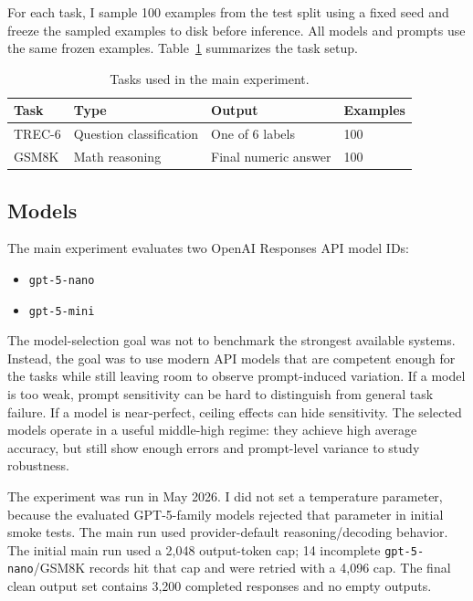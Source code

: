 \documentclass[11pt]{article}
\begin{document}
For each task, I sample 100 examples from the test split using a fixed seed and freeze the sampled examples to disk before inference. All models and prompts use the same frozen examples. Table~\ref{tab:tasks} summarizes the task setup.

\begin{table}[h]
\centering
\begin{tabular}{llll}
\toprule
Task & Type & Output & Examples \\
\midrule
TREC-6 & Question classification & One of 6 labels & 100 \\
GSM8K & Math reasoning & Final numeric answer & 100 \\
\bottomrule
\end{tabular}
\caption{Tasks used in the main experiment.}
\label{tab:tasks}
\end{table}

\subsection{Models}

The main experiment evaluates two OpenAI Responses API model IDs:

\begin{itemize}[leftmargin=*]
    \item \texttt{gpt-5-nano}
    \item \texttt{gpt-5-mini}
\end{itemize}

The model-selection goal was not to benchmark the strongest available systems. Instead, the goal was to use modern API models that are competent enough for the tasks while still leaving room to observe prompt-induced variation. If a model is too weak, prompt sensitivity can be hard to distinguish from general task failure. If a model is near-perfect, ceiling effects can hide sensitivity. The selected models operate in a useful middle-high regime: they achieve high average accuracy, but still show enough errors and prompt-level variance to study robustness.

The experiment was run in May 2026. I did not set a temperature parameter, because the evaluated GPT-5-family models rejected that parameter in initial smoke tests. The main run used provider-default reasoning/decoding behavior. The initial main run used a 2,048 output-token cap; 14 incomplete \texttt{gpt-5-nano}/GSM8K records hit that cap and were retried with a 4,096 cap. The final clean output set contains 3,200 completed responses and no empty outputs.
\end{document}
